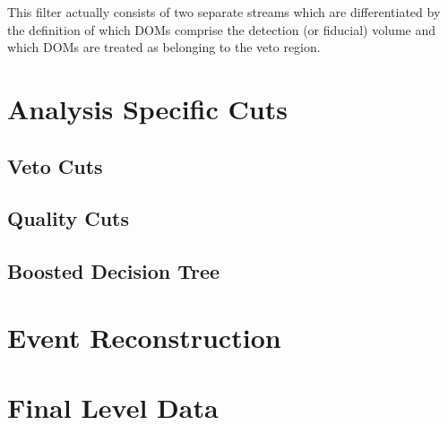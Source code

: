 \documentclass{gatech-thesis}
\begin{document}

This filter actually consists of two separate streams which are differentiated by the definition of which DOMs comprise the detection (or fiducial) volume and which DOMs are treated as belonging to the veto region.

\section{Analysis Specific Cuts}

\subsection{Veto Cuts}

\subsection{Quality Cuts}

\subsection{Boosted Decision Tree}


\section{Event Reconstruction}

\section{Final Level Data}

\end{document}
